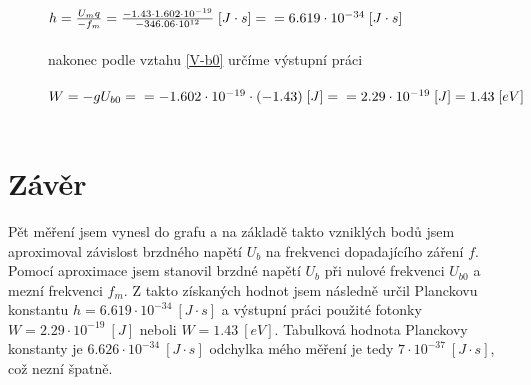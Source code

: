 \documentclass{article}
\begin{document}
\begin{figure}[H]
\begin{minipage}[t]{0.35\textwidth}
        \\
        \(
            \scriptsize
            h=\frac{U_mq}{-f_m}=\frac{-1.43\cdot1.602\cdot10^{-19}}{-346.06\cdot10^{12}}~[J\cdot s]=\\\\=6.619\cdot10^{-34}~[J\cdot s]
        \)\\
        \\
        nakonec podle vztahu \ref{V-b0} určíme výstupní práci\\
        \\
        \(
            \scriptsize
            W=-gU_{b0}=\\\\=-1.602\cdot10^{-19}\cdot(-1.43)~[J]=\\\\=2.29\cdot10^{-19}~[J]=1.43~[eV]
        \)\\
        \\
    \end{minipage}
\end{figure}

\section{Závěr}
Pět měření jsem vynesl do grafu a na základě takto vzniklých bodů jsem aproximoval závislost brzdného napětí \(U_b\) na frekvenci dopadajícího záření \(f\).
Pomocí aproximace jsem stanovil brzdné napětí \(U_b\) při nulové frekvenci \(U_{b0}\) a mezní frekvenci \(f_m\).
Z takto získaných hodnot jsem následně určil Planckovu konstantu \(h = 6.619\cdot10^{-34}~[J\cdot s]\) a výstupní práci použité fotonky \(W = 2.29\cdot10^{-19}~[J]\) neboli \(W =1.43~[eV]\).
Tabulková hodnota Planckovy konstanty je \(6.626\cdot10^{-34}~[J\cdot s]\) odchylka mého měření je tedy \(7\cdot10^{-37}~[J\cdot s]\), což nezní špatně.
\end{document}
